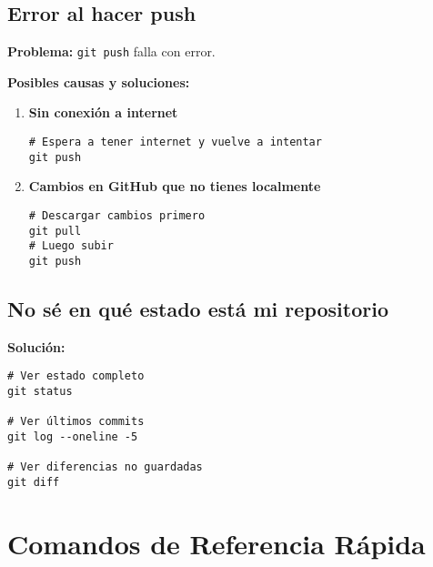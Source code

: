 \documentclass[12pt,a4paper]{article}
\begin{document}
\subsection{Error al hacer push}

\textbf{Problema:} \texttt{git push} falla con error.

\textbf{Posibles causas y soluciones:}
\begin{enumerate}
  \item \textbf{Sin conexión a internet}
    \begin{lstlisting}[style=bashstyle]
# Espera a tener internet y vuelve a intentar
git push
    \end{lstlisting}

  \item \textbf{Cambios en GitHub que no tienes localmente}
    \begin{lstlisting}[style=bashstyle]
# Descargar cambios primero
git pull
# Luego subir
git push
    \end{lstlisting}
\end{enumerate}

\subsection{No sé en qué estado está mi repositorio}

\textbf{Solución:}
\begin{lstlisting}[style=bashstyle]
# Ver estado completo
git status

# Ver últimos commits
git log --oneline -5

# Ver diferencias no guardadas
git diff
\end{lstlisting}

\section{Comandos de Referencia Rápida}
\end{document}
